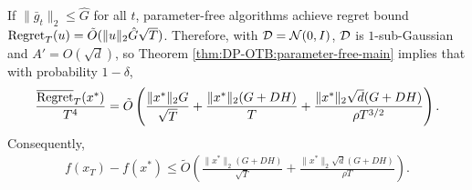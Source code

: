 \begin{remark}
If $\|\bar g_t\|_2 \leq \hat G$ for all $t$, parameter-free algorithms achieve regret bound $\mathrm{Regret}_T(u) = \tilde O(\|u\|_2\hat G\sqrt{T})$. Therefore, with ${\cal D}={\cal N}(0,I)$, ${\cal D}$ is $1$-sub-Gaussian and $A'=O(\sqrt{d})$, so Theorem \ref{thm:DP-OTB:parameter-free-main} implies that with probability $1-\delta$,
\begin{align*}
    \frac{\overline{\mathrm{Regret}}_T(x^*)}{T^4} = \tilde O\left( \frac{\|x^*\|_2G}{\sqrt{T}} + \frac{\|x^*\|_2(G+DH)}{T} + \frac{\|x^*\|_2\sqrt{d}(G+DH)}{\rho T^{3/2}} \right).
\end{align*}
Consequently,
\begin{align*}
    f(x_T) - f(x^*) \leq \tilde O\left( \frac{\|x^*\|_2(G+DH)}{\sqrt{T}} + \frac{\|x^*\|_2\sqrt{d}(G+DH)}{\rho T} \right).
\end{align*}
\end{remark}

